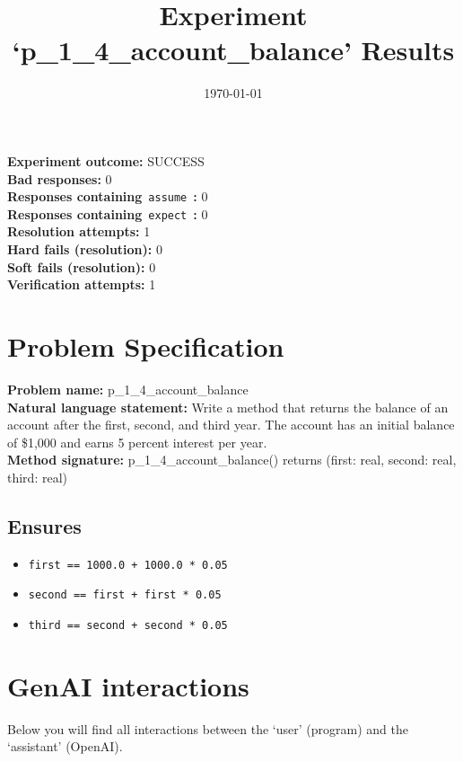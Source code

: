 \documentclass{article}
\begin{document}
\title{Experiment `p\_1\_4\_account\_balance' Results}
\author{\today}
\date{}
\maketitle
\textbf{Experiment outcome: }SUCCESS
\\\textbf{Bad responses: }0
\\\textbf{Responses containing}~\texttt{assume}~\textbf{: }0
\\\textbf{Responses containing}~\texttt{expect}~\textbf{: }0
\\\textbf{Resolution attempts: }1
\\\textbf{Hard fails (resolution): }0
\\\textbf{Soft fails (resolution): }0
\\\textbf{Verification attempts: }1
\section*{Problem Specification}
\textbf{Problem name: }p\_1\_4\_account\_balance
\\\textbf{Natural language statement: }Write a method that returns the balance of an account after the first, second, and third year. The account has an initial balance of \$1,000 and earns 5 percent interest per year.
\\\textbf{Method signature: }p\_1\_4\_account\_balance() returns (first: real, second: real, third: real)
\subsection*{Ensures}
\begin{itemize}
\item \texttt{first == 1000.0 + 1000.0 * 0.05}
\item \texttt{second == first + first * 0.05}
\item \texttt{third == second + second * 0.05}
\end{itemize}
\clearpage
\section*{GenAI interactions}
Below you will find all interactions between the `user' (program) and the `assistant' (OpenAI).
\end{document}
